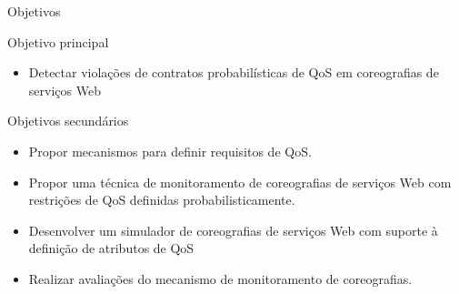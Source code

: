 \documentclass[xcolor=svgnames]{beamer}
\begin{document}
    \begin{frame}{Objetivos}
        \begin{block}{Objetivo principal}\vspace{-.3\baselineskip}
        	\begin{itemize}
                  \item Detectar violações de contratos probabilísticas de QoS em coreografias de serviços Web
            \end{itemize}
        \end{block}
        \begin{block}{Objetivos secundários}\vspace{-.3\baselineskip}
        	\begin{itemize}
		  \item	Propor mecanismos para definir requisitos de QoS.
                  \item Propor uma técnica de monitoramento de coreografias de serviços Web com restrições de QoS
definidas probabilisticamente.
		  \item Desenvolver um simulador de coreografias de serviços Web com suporte à definição de atributos de QoS
                  \item Realizar avaliações do mecanismo de monitoramento de coreografias. %
        	\end{itemize}
        \end{block}
    \end{frame}
\end{document}
